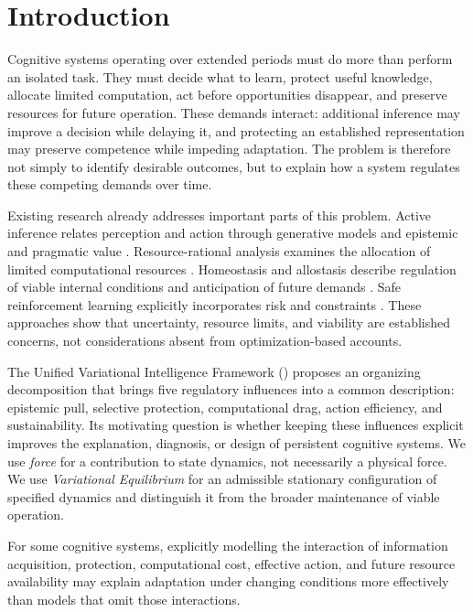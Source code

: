 \section{Introduction}
\label{sec:introduction}

Cognitive systems operating over extended periods must do more than perform an isolated task. They must decide what to learn, protect useful knowledge, allocate limited computation, act before opportunities disappear, and preserve resources for future operation. These demands interact: additional inference may improve a decision while delaying it, and protecting an established representation may preserve competence while impeding adaptation. The problem is therefore not simply to identify desirable outcomes, but to explain how a system regulates these competing demands over time.

Existing research already addresses important parts of this problem. Active inference relates perception and action through generative models and epistemic and pragmatic value \citep{friston2010fep,parr2022active}. Resource-rational analysis examines the allocation of limited computational resources \citep{lieder2019resourcerational,griffiths2015rational}. Homeostasis and allostasis describe regulation of viable internal conditions and anticipation of future demands \citep{billman2020homeostasis,schulkin2019allostasis}. Safe reinforcement learning explicitly incorporates risk and constraints \citep{garcia2015saferl}. These approaches show that uncertainty, resource limits, and viability are established concerns, not considerations absent from optimization-based accounts.

The Unified Variational Intelligence Framework (\uvif{}) proposes an organizing decomposition that brings five regulatory influences into a common description: epistemic pull, selective protection, computational drag, action efficiency, and sustainability. Its motivating question is whether keeping these influences explicit improves the explanation, diagnosis, or design of persistent cognitive systems. We use \emph{force} for a contribution to state dynamics, not necessarily a physical force. We use \emph{Variational Equilibrium} for an admissible stationary configuration of specified dynamics and distinguish it from the broader maintenance of viable operation.

\begin{principle}
\label{prin:veq}
For some cognitive systems, explicitly modelling the interaction of information acquisition, protection, computational cost, effective action, and future resource availability may explain adaptation under changing conditions more effectively than models that omit those interactions.
\end{principle}

